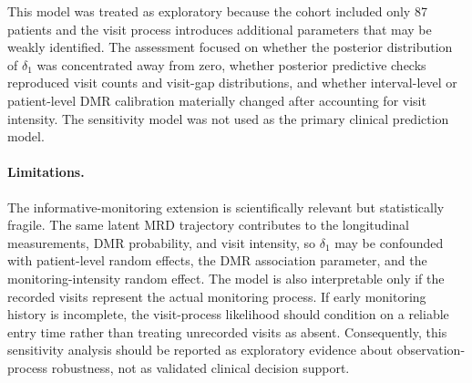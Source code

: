 This model was treated as exploratory because the cohort included only 87 patients and the visit process introduces additional parameters that may be weakly identified. The assessment focused on whether the posterior distribution of \(\delta_1\) was concentrated away from zero, whether posterior predictive checks reproduced visit counts and visit-gap distributions, and whether interval-level or patient-level DMR calibration materially changed after accounting for visit intensity. The sensitivity model was not used as the primary clinical prediction model.

\paragraph{Limitations.}
The informative-monitoring extension is scientifically relevant but statistically fragile. The same latent MRD trajectory contributes to the longitudinal measurements, DMR probability, and visit intensity, so \(\delta_1\) may be confounded with patient-level random effects, the DMR association parameter, and the monitoring-intensity random effect. The model is also interpretable only if the recorded visits represent the actual monitoring process. If early monitoring history is incomplete, the visit-process likelihood should condition on a reliable entry time rather than treating unrecorded visits as absent. Consequently, this sensitivity analysis should be reported as exploratory evidence about observation-process robustness, not as validated clinical decision support.
